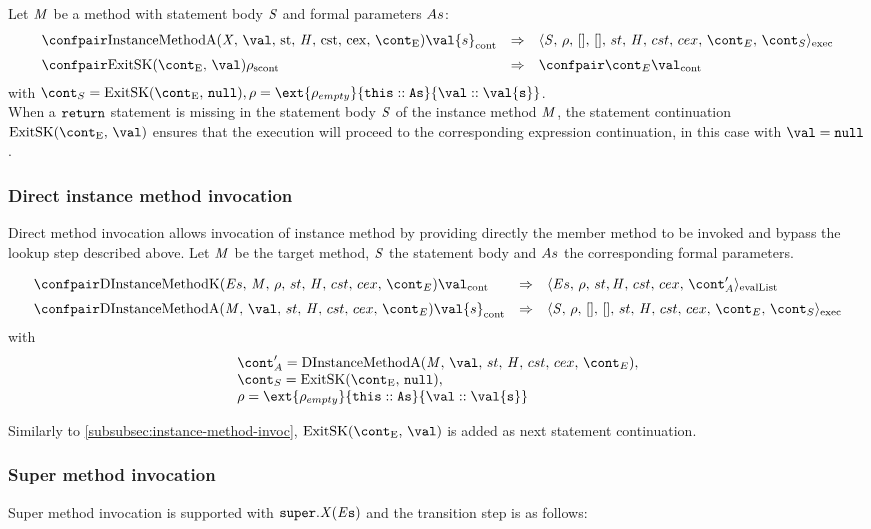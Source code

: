 \documentclass{article}
\begin{document}
\noindent
Let $\mathit{M}$ be a method with statement body $\mathit{S}$ and formal parameters $As$:
\[
  \begin{array}{lcl}
	\cesktrans{
		\contconf{\InstanceMethodInvocationArgsApp}{\val{s}}}{
		\execconf{\stmt}{\env}{[]}{[]}{\handler}{\cstrace}{\cex}{\econt}{\scont}}
	\\[2mm]
	\cesktrans{
		\scontconf{\ExitSK{\val}}{\env}}{
		\contconf{\econt}{\val}}
  \end{array}
\]
with $\scont = \ExitSK{\tt{null}}, \env = \ext{\env_{empty}}{\this :: \formals}{\val :: \val{s}}$.\\[2mm]

\noindent
When a $\tt{return}$ statement is missing in the statement body $\mathit{S}$ of the instance method $\mathit{M}$, the statement continuation $\ExitSK{\val}$ ensures that the execution will proceed to the corresponding expression continuation, in this case with $\val = \tt{null}$.

\subsubsection{Direct instance method invocation}
\label{subsubsec:direct-instance-method-invoc}
Direct method invocation allows invocation of instance method by providing directly the member method to be invoked and bypass the lookup step described above.
Let $\mathit{M}$ be the target method, $\mathit{S}$ the statement body and $As$ the corresponding formal parameters.

\[
  \begin{array}{lcl}
	\cesktrans{
		\contconf{\DInstanceMethodK}{\val}}{
		\evallistconf{\expressionsmeta}{\env}{\strace}{\cstrace}{\cex}{\acont'}}
	\\[2mm]

	\cesktrans{
		\contconf{\DInstanceMethodA}{\val{s}}}{
		\execconf{\stmt}{\env}{[]}{[]}{\handler}{\cstrace}{\cex}{\econt}{\scont}}
  \end{array}
\]
with
\[
\begin{array}{l}
	\acont' = \DInstanceMethodA,\\
	\scont = \ExitSK{\tt{null}},\\
	\env = \ext{\env_{empty}}{\this :: \formals}{\val :: \val{s}}
\end{array}
\]

\noindent
Similarly to \ref{subsubsec:instance-method-invoc}, $\ExitSK{\val}$ is added as next statement continuation.

\subsubsection{Super method invocation}
\label{subsubsec:super-method-invocation}
Super method invocation is supported with $\tt{super}.\mathit{X}(\mathit{E}{s})$ and the transition step is as follows:
\end{document}

